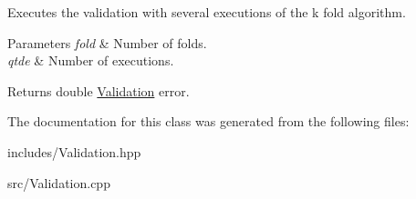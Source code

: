 Executes the validation with several executions of the k fold algorithm. 


\begin{DoxyParams}{Parameters}
{\em fold} & Number of folds. \\
\hline
{\em qtde} & Number of executions. \\
\hline
\end{DoxyParams}
\begin{DoxyReturn}{Returns}
double \hyperlink{class_validation}{Validation} error. 
\end{DoxyReturn}


The documentation for this class was generated from the following files\+:\begin{DoxyCompactItemize}
\item 
includes/Validation.\+hpp\item 
src/Validation.\+cpp\end{DoxyCompactItemize}
